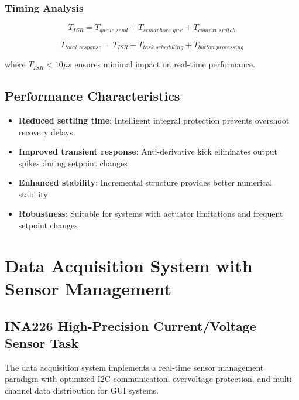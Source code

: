 \documentclass{article}
\begin{document}
\subsubsection{Timing Analysis}

\begin{equation}
T_{ISR} = T_{queue\_send} + T_{semaphore\_give} + T_{context\_switch}
\end{equation}

\begin{equation}
T_{total\_response} = T_{ISR} + T_{task\_scheduling} + T_{button\_processing}
\end{equation}

where $T_{ISR} < 10\mu s$ ensures minimal impact on real-time performance.

\subsection{Performance Characteristics}

\begin{itemize}
    \item \textbf{Reduced settling time}: Intelligent integral protection prevents overshoot recovery delays
    \item \textbf{Improved transient response}: Anti-derivative kick eliminates output spikes during setpoint changes
    \item \textbf{Enhanced stability}: Incremental structure provides better numerical stability
    \item \textbf{Robustness}: Suitable for systems with actuator limitations and frequent setpoint changes
\end{itemize}

\section{Data Acquisition System with Sensor Management}

\subsection{INA226 High-Precision Current/Voltage Sensor Task}

The data acquisition system implements a real-time sensor management paradigm with optimized I2C communication, overvoltage protection, and multi-channel data distribution for GUI systems.
\end{document}
